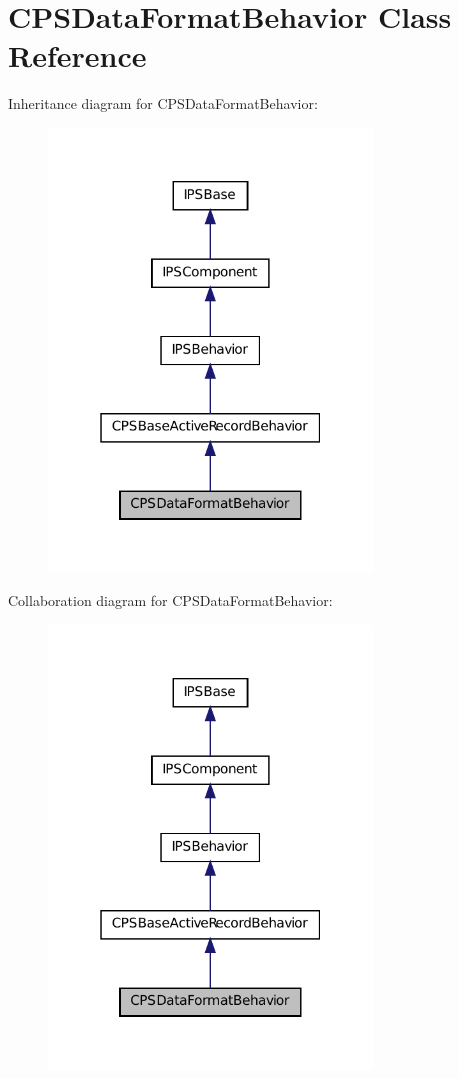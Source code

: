 \hypertarget{classCPSDataFormatBehavior}{
\section{CPSDataFormatBehavior Class Reference}
\label{classCPSDataFormatBehavior}
}


Inheritance diagram for CPSDataFormatBehavior:\nopagebreak
\begin{figure}[H]
\begin{center}
\leavevmode
\includegraphics[width=244pt]{classCPSDataFormatBehavior__inherit__graph}
\end{center}
\end{figure}


Collaboration diagram for CPSDataFormatBehavior:\nopagebreak
\begin{figure}[H]
\begin{center}
\leavevmode
\includegraphics[width=244pt]{classCPSDataFormatBehavior__coll__graph}
\end{center}
\end{figure}
